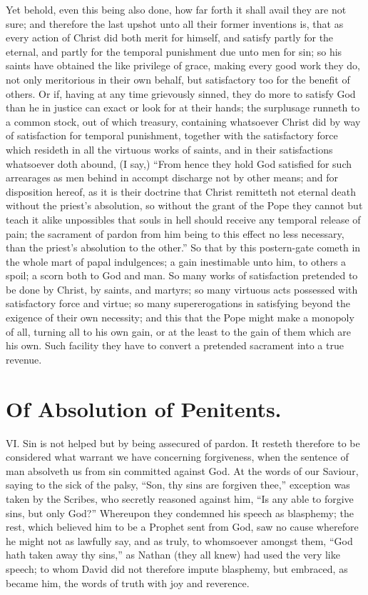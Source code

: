 Yet behold, even this being also done, how far forth it shall avail they are not sure; and therefore the last upshot unto all their former inventions is, that as every action of Christ did both merit for himself, and satisfy partly for the eternal, and partly for the temporal punishment due unto men for sin; so his saints have obtained the like privilege of grace, making every good work they do, not only meritorious in their own behalf, but satisfactory too for the benefit of others. Or if, having at any time grievously sinned, they do more to satisfy God than he in justice can exact or look for at their hands; the surplusage runneth to a common stock, out of which treasury, containing whatsoever Christ did by way of satisfaction for temporal punishment, together with the satisfactory force which resideth in all the virtuous works of saints, and in their satisfactions whatsoever doth abound, (I say,) “From hence they hold God satisfied for such arrearages as men behind in accompt discharge not by other means; and for disposition hereof, as it is their doctrine that Christ remitteth not eternal death without the priest’s absolution, so without the grant of the Pope they cannot but teach it alike unpossibles that souls in hell should receive any temporal release of pain; the sacrament of pardon from him being to this effect no less necessary, than the priest’s absolution to the other.” So that by this postern-gate cometh in the whole mart of papal indulgences; a gain inestimable unto him, to others a spoil; a scorn both to God and man. So many works of satisfaction pretended to be done by Christ, by saints, and martyrs; so many virtuous acts possessed with satisfactory force and virtue; so many  supererogations in satisfying beyond the exigence of their own necessity; and this that the Pope might make a monopoly of all, turning all to his own gain, or at the least to the gain of them which are his own. Such facility they have to convert a pretended sacrament into a true revenue.

\section*{Of Absolution of Penitents.}

VI. Sin is not helped but by being assecured of pardon. It resteth therefore to be considered what warrant we have concerning forgiveness, when the sentence of man absolveth us from sin committed against God. At the words of our Saviour, saying to the sick of the palsy, “Son, thy sins are forgiven thee,” exception was taken by the Scribes, who secretly reasoned against him, “Is any able to forgive sins, but only God?” Whereupon they condemned his speech as blasphemy; the rest, which believed him to be a Prophet sent from God, saw no cause wherefore he might not as lawfully say, and as truly, to whomsoever amongst them, “God hath taken away thy sins,” as Nathan (they all knew) had used the very like speech; to whom David did not therefore impute blasphemy, but embraced, as became him, the words of truth with joy and reverence.

